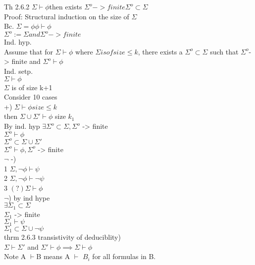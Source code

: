 \documentclass[12pt,oneside,notitlepage]{book}
\theoremstyle{definition}
\begin{document}
Th 2.6.2 $\Sigma \vdash \phi $then exists $\Sigma^o -> finite \Sigma^o \subset \Sigma$ \\
Proof: Structural induction on the size of $\Sigma$ \\
Bc. $\Sigma = {\phi} \phi \vdash \phi$ \\
$\Sigma^o := \Sigma and \Sigma^o -> finite$ \\
Ind. hyp. \\
Assume that for $\Sigma \vdash \phi$ where $\Sigma is of size \leq k$, there exists a $\Sigma^o \subset \Sigma$ such that $\Sigma^o $-> finite and $\Sigma^o \vdash \phi$  \\
Ind. setp. \\
$\Sigma \vdash \phi$ \\
$\Sigma$ is of size k+1 \\
Consider 10 cases \\
+) $\Sigma \vdash \phi size \leq k$ \\
then $\Sigma \cup \Sigma' \vdash \phi$ size $k_1$ \\
By ind. hyp $\exists \Sigma^o \subset \Sigma , \Sigma^o$ -> finite \\
$\Sigma^o \vdash \phi$ \\
$\Sigma^o \subset \Sigma \cup \Sigma'$ \\
$\Sigma^o \vdash \phi, \Sigma^o$ -> finite \\
$\neg$ -) \\
1 $\Sigma, \neg \phi \vdash \psi$ \\
2 $\Sigma, \neg \phi \vdash \neg \psi$ \\
3 $(?) \Sigma \vdash \phi$ \\
$\neg$) by ind hype \\
$\exists \Sigma_1 \subset \Sigma$ \\
$\Sigma_1$ -> finite \\
$\Sigma_1 \vdash \psi$ \\
$\Sigma_1 \subset \Sigma \cup {\neg\psi }$ \\

thrm 2.6.3 transistivity of deduciblity) \\
$\Sigma \vdash \Sigma'$ and $\Sigma' \vdash \phi \implies \Sigma \vdash \phi$ \\
Note A $\vdash $B means A $\vdash$ $B_i$ for all formulas in B. 
\end{document}
